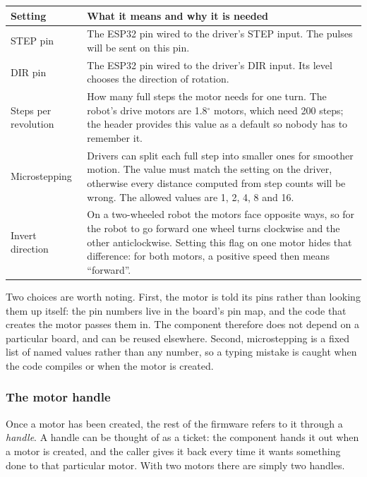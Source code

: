 \begin{center}
\begin{tabularx}{\linewidth}{@{}l X@{}}
\toprule
\textbf{Setting} & \textbf{What it means and why it is needed} \\
\midrule
STEP pin & The ESP32 pin wired to the driver's STEP input. The pulses will be sent on this pin. \\
DIR pin & The ESP32 pin wired to the driver's DIR input. Its level chooses the direction of rotation. \\
Steps per revolution & How many full steps the motor needs for one turn. The robot's drive motors are 1.8$^\circ$ motors, which need 200 steps; the header provides this value as a default so nobody has to remember it. \\
Microstepping & Drivers can split each full step into smaller ones for smoother motion. The value must match the setting on the driver, otherwise every distance computed from step counts will be wrong. The allowed values are 1, 2, 4, 8 and 16. \\
Invert direction & On a two-wheeled robot the motors face opposite ways, so for the robot to go forward one wheel turns clockwise and the other anticlockwise. Setting this flag on one motor hides that difference: for both motors, a positive speed then means ``forward''. \\
\bottomrule
\end{tabularx}
\end{center}

Two choices are worth noting. First, the motor is told its pins rather than looking them up itself: the pin numbers live in the board's pin map, and the code that creates the motor passes them in. The component therefore does not depend on a particular board, and can be reused elsewhere. Second, microstepping is a fixed list of named values rather than any number, so a typing mistake is caught when the code compiles or when the motor is created.

\subsubsection{The motor handle}
Once a motor has been created, the rest of the firmware refers to it through a \emph{handle}. A handle can be thought of as a ticket: the component hands it out when a motor is created, and the caller gives it back every time it wants something done to that particular motor. With two motors there are simply two handles.


